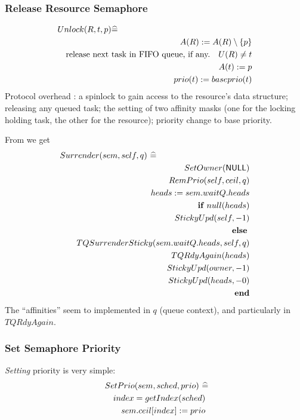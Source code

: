 \subsubsection{Release Resource Semaphore}

\begin{eqnarray*}
   \lefteqn{Unlock(R,t,p) \defs {}}
\\ && A(R) := A(R) \setminus \setof p
\\ && \textrm{release next task in FIFO queue, if any.}
      \quad
      U(R) \neq t
\\ && A(t) := p
\\ && prio(t) := baseprio(t)
\end{eqnarray*}
Protocol overhead \cite{Burns:2013:MrsP}:
a spinlock to gain access to the resource’s data structure;
releasing any queued task;
the setting of two affinity masks
(one for the locking holding task, the other for the resource);
priority change to base priority.

From \cite[pp45--46, Fig. 16]{Gomes:2019:MrsP} we get
\begin{eqnarray*}
   \lefteqn{Surrender(sem,self,q) ~ \defs}
\\ && SetOwner(\NULL)
\\ && RemPrio(self,ceil,q)
\\ && heads := sem.waitQ.heads
\\ && \IF null(heads)
\\ && \quad StickyUpd(self,-1)
\\ && \ELSE
\\ && \quad TQSurrenderSticky(sem.waitQ.heads,self,q)
\\ && \quad TQRdyAgain(heads)
\\ && \quad StickyUpd(owner,-1)
\\ && \quad StickyUpd(heads,-0)
\\ && \END
\end{eqnarray*}
The ``affinities'' seem to implemented in $q$ (queue context),
and particularly in $TQRdyAgain$.

\subsubsection{Set Semaphore Priority}

\emph{Setting} priority is very simple:
\begin{eqnarray*}
   \lefteqn{SetPrio(sem,sched,prio)~\defs}
\\&& index = getIndex(sched)
\\ && sem.ceil[index] := prio
\end{eqnarray*}


